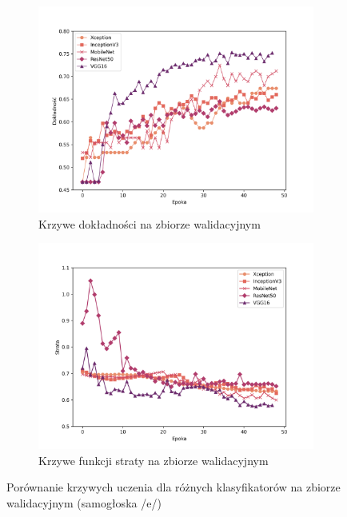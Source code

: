 \begin{figure}[ht]
    \centering
    \begin{subfigure}{0.49\textwidth}
        \centering
        \includegraphics[width=\textwidth]{./img/results/e_acc}
        \caption{Krzywe dokładności na zbiorze walidacyjnym\@}
        \label{fig:e_acc}
    \end{subfigure}
    \begin{subfigure}{0.49\textwidth}
        \centering
        \includegraphics[width=\textwidth]{./img/results/e_loss}
        \caption{Krzywe funkcji straty na zbiorze walidacyjnym\@}
        \label{fig:e_loss}
    \end{subfigure}

    \caption{Porównanie krzywych uczenia dla różnych klasyfikatorów na zbiorze walidacyjnym (samogłoska /e/)}
    \label{fig:e_results}
\end{figure}

